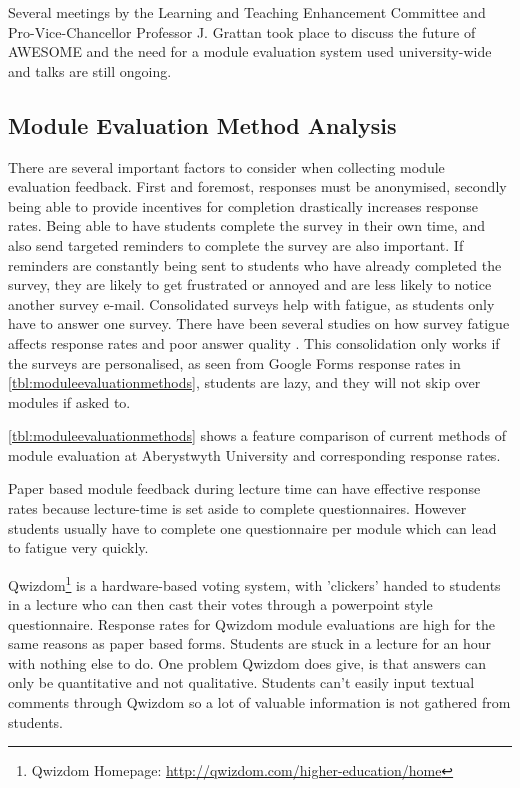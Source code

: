	Several meetings by the Learning and Teaching Enhancement Committee and Pro-Vice-Chancellor Professor J. Grattan took place to discuss the future of \ac{AWESOME} and the need for a module evaluation system used university-wide and talks are still ongoing.
	
	\subsection{Module Evaluation Method Analysis}
	\label{ssec:moduleevaluation}

	There are several important factors to consider when collecting module evaluation feedback.
	First and foremost, responses must be anonymised, secondly being able to provide incentives for completion drastically increases response rates.
	Being able to have students complete the survey in their own time, and also send targeted reminders to complete the survey are also important.
	If reminders are constantly being sent to students who have already completed the survey, they are likely to get frustrated or annoyed and are less likely to notice another survey e-mail.
	Consolidated surveys help with fatigue, as students only have to answer one survey.
	There have been several studies on how survey fatigue affects response rates and poor answer quality \cite{citeulike:13579648}.
	This consolidation only works if the surveys are personalised, as seen from Google Forms response rates in \autoref{tbl:moduleevaluationmethods}, students are lazy, and they will not skip over modules if asked to.
	
	\autoref{tbl:moduleevaluationmethods} shows a feature comparison of current methods of module evaluation at Aberystwyth University and corresponding response rates.
	
	Paper based module feedback during lecture time can have effective response rates because lecture-time is set aside to complete questionnaires.
	However students usually have to complete one questionnaire per module which can lead to fatigue very quickly.

	Qwizdom\footnote{Qwizdom Homepage: \url{http://qwizdom.com/higher-education/home}} is a hardware-based voting system, with 'clickers' handed to students in a lecture who can then cast their votes through a powerpoint style questionnaire.
	Response rates for Qwizdom module evaluations are high for the same reasons as paper based forms.
	Students are stuck in a lecture for an hour with nothing else to do.
	One problem Qwizdom does give, is that answers can only be quantitative and not qualitative.
	Students can't easily input textual comments through Qwizdom so a lot of valuable information is not gathered from students.

